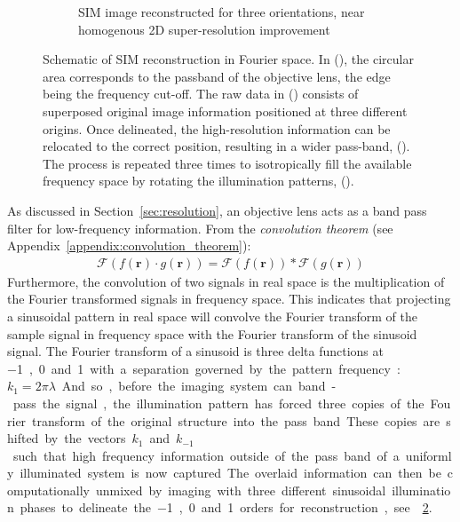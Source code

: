 \begin{figure}
\begin{subfigure}[t]{0.35\textwidth}
        \caption{\gls{SIM} image reconstructed for three orientations, near homogenous 2D \gls{super-resolution} improvement}\label{fig:sim_full_flower}
    \end{subfigure}
    \caption[Schematic of \gls{SIM} reconustruction in Fourier space]
        {Schematic of \gls{SIM} reconstruction in Fourier space.
        In (), the circular area corresponds to the passband of the \gls{objective lens}, the edge being the frequency cut-off.
        The raw data in () consists of superposed original image information
        positioned at three different origins.
        Once delineated, the high-resolution information can be relocated to the correct position, resulting in a wider pass-band, ().
        The process is repeated three times to isotropically fill the available frequency space by rotating the illumination patterns, ().
        }\label{fig:sim_flowers}
\end{figure}

As discussed in Section~\ref{sec:resolution}, an \gls{objective lens} acts as a band pass filter for low-frequency information.
From the \emph{\Gls{convolution theorem}} (see Appendix~\ref{appendix:convolution_theorem}):
\begin{align}
  \mathcal{F} (f(\mathbf{r}) \cdot g(\mathbf{r})) = \mathcal{F}(f(\mathbf{r})) * \mathcal{F}(g(\mathbf{r}))
\end{align}
Furthermore, the convolution of two signals in real space is the multiplication of the Fourier transformed signals in frequency space.
This indicates that projecting a sinusoidal pattern in real space will convolve the Fourier transform of the sample signal in frequency space with the Fourier transform of the sinusoid signal.
The Fourier transform of a sinusoid is three delta functions at \SI{-1}, \SI{0} and \SI{+1} with a separation governed by the pattern frequency: \(k_1 = {2\pi}{\lambda} \).
And so, before the imaging system can band-pass the signal, the illumination pattern has forced three copies of the Fourier transform of the original structure into the pass band.
These copies are shifted by the vectors \(k_1 \) and \(k_{-1} \) such that high frequency information outside of the pass band of a uniformly illuminated system is now captured. %
The overlaid information can then be computationally unmixed by imaging with three different sinusoidal illumination phases to delineate the \SI{-1}{}, \SI{0}{} and \SI{+1}{} orders for reconstruction, see \figurename~\ref{fig:sim_flowers}.

